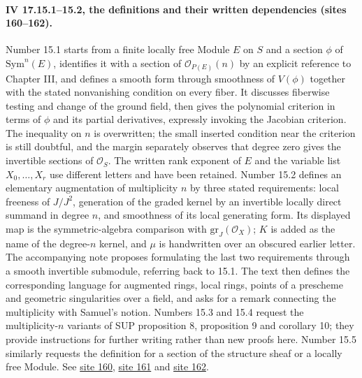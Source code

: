 \paragraph{IV 17.15.1--15.2, the definitions and their written dependencies (sites 160--162).}
Number 15.1 starts from a finite locally free Module $E$ on $S$ and a section $\phi$ of $\mathrm{Sym}^n(E)$, identifies it with a section of $\mathcal O_{P(E)}(n)$ by an explicit reference to Chapter III, and defines a smooth form through smoothness of $V(\phi)$ together with the stated nonvanishing condition on every fiber. It discusses fiberwise testing and change of the ground field, then gives the polynomial criterion in terms of $\phi$ and its partial derivatives, expressly invoking the Jacobian criterion. The inequality on $n$ is overwritten; the small inserted condition near the criterion is still doubtful, and the margin separately observes that degree zero gives the invertible sections of $\mathcal O_S$. The written rank exponent of $E$ and the variable list $X_0,\ldots,X_r$ use different letters and have been retained. Number 15.2 defines an elementary augmentation of multiplicity $n$ by three stated requirements: local freeness of $J/J^2$, generation of the graded kernel by an invertible locally direct summand in degree $n$, and smoothness of its local generating form. Its displayed map is the symmetric-algebra comparison with $\mathrm{gr}_J(\mathcal O_X)$; $K$ is added as the name of the degree-$n$ kernel, and $\mu$ is handwritten over an obscured earlier letter. The accompanying note proposes formulating the last two requirements through a smooth invertible submodule, referring back to 15.1. The text then defines the corresponding language for augmented rings, local rings, points of a prescheme and geometric singularities over a field, and asks for a remark connecting the multiplicity with Samuel's notion. Numbers 15.3 and 15.4 request the multiplicity-$n$ variants of SUP proposition 8, proposition 9 and corollary 10; they provide instructions for further writing rather than new proofs here. Number 15.5 similarly requests the definition for a section of the structure sheaf or a locally free Module. See \href{https://grothendieck.umontpellier.fr/web/viewer.html?file=../25.pdf#page=161}{site 160}, \href{https://grothendieck.umontpellier.fr/web/viewer.html?file=../25.pdf#page=162}{site 161} and \href{https://grothendieck.umontpellier.fr/web/viewer.html?file=../25.pdf#page=163}{site 162}.

